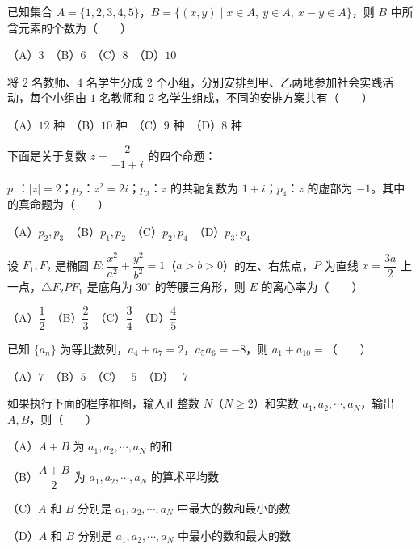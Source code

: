 \begin{question}
已知集合 $A=\{1,2,3,4,5\}$，$B=\{(x,y)\mid x\in A,\ y\in A,\ x-y\in A\}$，则 $B$ 中所含元素的个数为\mbox{（　　）}

（A）$3$　（B）$6$　（C）$8$　（D）$10$

\end{question}
\begin{question}
将 $2$ 名教师、$4$ 名学生分成 $2$ 个小组，分别安排到甲、乙两地参加社会实践活动，每个小组由 $1$ 名教师和 $2$ 名学生组成，不同的安排方案共有\mbox{（　　）}

（A）$12$ 种　（B）$10$ 种　（C）$9$ 种　（D）$8$ 种

\end{question}
\begin{question}
下面是关于复数 $z=\dfrac{2}{-1+i}$ 的四个命题：

$p_1$：$|z|=2$；$p_2$：$z^2=2i$；$p_3$：$z$ 的共轭复数为 $1+i$；$p_4$：$z$ 的虚部为 $-1$。其中的真命题为\mbox{（　　）}

（A）$p_2,p_3$　（B）$p_1,p_2$　（C）$p_2,p_4$　（D）$p_3,p_4$

\end{question}
\begin{question}
设 $F_1,F_2$ 是椭圆 $E:\dfrac{x^2}{a^2}+\dfrac{y^2}{b^2}=1$（$a>b>0$）的左、右焦点，$P$ 为直线 $x=\dfrac{3a}{2}$ 上一点，$\triangle F_2PF_1$ 是底角为 $30^\circ$ 的等腰三角形，则 $E$ 的离心率为\mbox{（　　）}

（A）$\dfrac12$　（B）$\dfrac23$　（C）$\dfrac34$　（D）$\dfrac45$

\end{question}
\begin{question}
已知 $\{a_n\}$ 为等比数列，$a_4+a_7=2$，$a_5a_6=-8$，则 $a_1+a_{10}=$\mbox{（　　）}

（A）$7$　（B）$5$　（C）$-5$　（D）$-7$

\Needspace{0.4\textheight}
\end{question}
\begin{question}
如果执行下面的程序框图，输入正整数 $N$（$N\geqslant2$）和实数 $a_1,a_2,\cdots,a_N$，输出 $A,B$，则\mbox{（　　）}
\nopagebreak[4]
\begin{center}\end{center}
\nopagebreak[4]
（A）$A+B$ 为 $a_1,a_2,\cdots,a_N$ 的和

（B）$\dfrac{A+B}{2}$ 为 $a_1,a_2,\cdots,a_N$ 的算术平均数

（C）$A$ 和 $B$ 分别是 $a_1,a_2,\cdots,a_N$ 中最大的数和最小的数

（D）$A$ 和 $B$ 分别是 $a_1,a_2,\cdots,a_N$ 中最小的数和最大的数

\Needspace{0.4\textheight}
\end{question}
